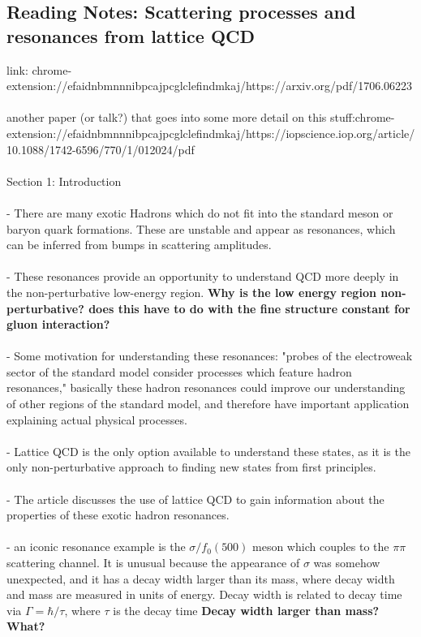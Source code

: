\subsection{Reading Notes: Scattering processes and resonances from lattice QCD}
link: chrome-extension://efaidnbmnnnibpcajpcglclefindmkaj/https://arxiv.org/pdf/1706.06223\\\\
 another paper (or talk?) that goes into some more detail on this stuff:chrome-extension://efaidnbmnnnibpcajpcglclefindmkaj/https://iopscience.iop.org/article/10.1088/1742-6596/770/1/012024/pdf\\\\
Section 1: Introduction\\\\
- There are many exotic Hadrons which do not fit into the standard meson or baryon quark formations. These are unstable and appear as resonances, which can be inferred from bumps in scattering amplitudes.\\\\
- These resonances provide an opportunity to understand QCD more deeply in the non-perturbative low-energy region. \textbf{Why is the low energy region non-perturbative? does this have to do with the fine structure constant for gluon interaction?}\\\\
- Some motivation for understanding these resonances: "probes of the electroweak sector of the standard model consider processes which feature hadron resonances," basically these hadron resonances could improve our understanding of other regions of the standard model, and therefore have important application explaining actual physical processes. \\\\
- Lattice QCD is the only option available to understand these states, as it is the only non-perturbative approach to finding new states from first principles. \\\\
- The article discusses the use of lattice QCD to gain information about the properties of these exotic hadron resonances. \\\\
- an iconic resonance example is the $\sigma/f_0(500)$ meson which couples to the $\pi\pi$ scattering channel. It is unusual because the appearance of $\sigma$ was somehow unexpected, and it has a decay width larger than its mass, where decay width and mass are measured in units of energy. Decay width is related to decay time via $\Gamma =\hbar/ \tau$, where $\tau$ is the decay time \textbf{Decay width larger than mass? What?}\\\\
